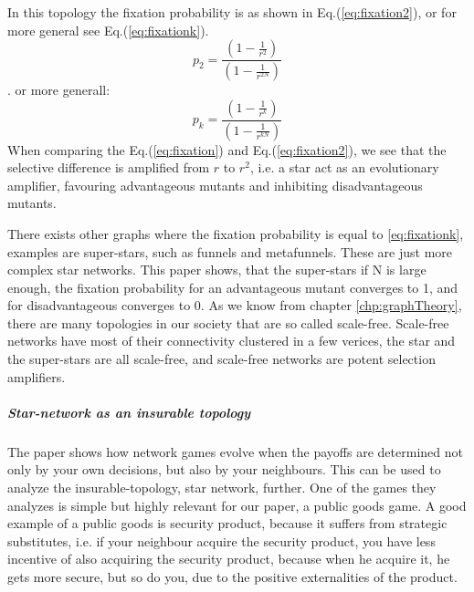 In this topology the fixation probability is as shown in Eq.(\ref{eq:fixation2}), or for more general see Eq.(\ref{eq:fixationk}). \begin{equation}p_{2}=\frac{(1-\frac{1}{r^{2}})}{(1-\frac{1}{r^{2N}})} \label{eq:fixation2} \end{equation}.
or more generall: \begin{equation}
p_{k}=\frac{(1-\frac{1}{r^{k}})}{(1-\frac{1}{r^{kN}})} \label{eq:fixationk}
\end{equation}
 When comparing the Eq.(\ref{eq:fixation}) and Eq.(\ref{eq:fixation2}), we see that the selective difference is
 amplified from $r$ to $r^{2}$, i.e. a star act as an evolutionary amplifier, favouring advantageous
  mutants and inhibiting disadvantageous mutants.

There exists other graphs where the fixation probability is equal to \ref{eq:fixationk}, examples are super-stars, such as funnels and
metafunnels. These are just more complex star networks. This paper shows,  that the super-stars if N is large enough, the fixation probability for an advantageous mutant converges to 1, 
and for disadvantageous converges to 0. 
As we know from chapter \ref{chp:graphTheory}, there are many
topologies in our society that are so called scale-free. Scale-free networks have most of their connectivity clustered in a few verices, the star and the super-stars are all scale-free, and scale-free networks are potent selection amplifiers.

\subparagraph{Star-network as an insurable topology}
The paper \cite{networkgames} shows how network games evolve when the payoffs are determined not only by your own decisions, but also by your neighbours. This can be used to analyze the insurable-topology, star network, further. One of the games they analyzes is simple but highly relevant for our paper, a public goods game. A good example of a public goods is security product, because it suffers from strategic substitutes, i.e. if your neighbour acquire the security product, you have less incentive of also acquiring the security product, because when he acquire it, he gets more secure, but so do you, due to the positive externalities of the product.

